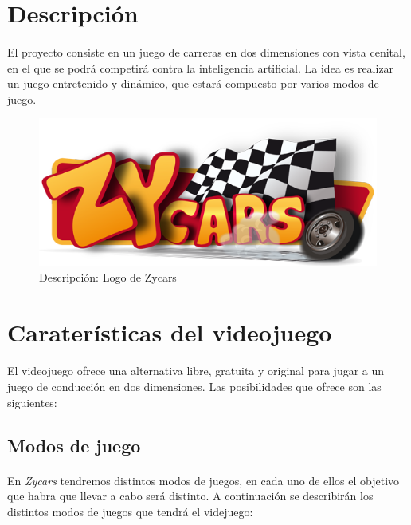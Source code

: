 
\section{Descripción}

\paragraph{}
El proyecto consiste en un juego de carreras en dos dimensiones con vista cenital, en el que se podrá competirá contra la 
inteligencia artificial. 
La idea es realizar un juego entretenido y dinámico, que estará compuesto por varios modos de juego.

\begin{figure}[H]
  \label{logo_zycars}
  \begin{center}
    \includegraphics[scale=0.5]{imagenes/logo_zycars.png}
  \end{center}
  \caption{Descripción: Logo de Zycars}
\end{figure}

\section{Caraterísticas del videojuego}

\paragraph{}
El videojuego ofrece una alternativa libre, gratuita y original para jugar a un juego de conducción en dos dimensiones. 
Las posibilidades que ofrece son las siguientes:

\subsection{Modos de juego}

\paragraph{}
En \emph{Zycars} tendremos distintos modos de juegos, en cada uno de ellos el objetivo que habra que llevar a cabo será distinto.
A continuación se describirán los distintos modos de juegos que tendrá el videjuego:

